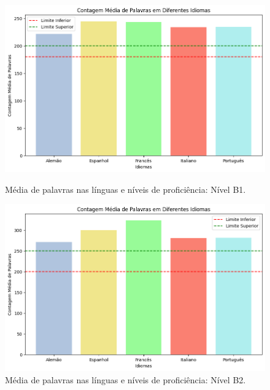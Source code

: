 \documentclass[portuguese]{textolivre}
\begin{document}
\begin{figure}[p]
 \centering
 \begin{minipage}{.47\textwidth}
 \includegraphics[width=\textwidth]{Fig3.png}
 \caption{Média de palavras nas línguas e níveis de proficiência: Nível B1.}
 \label{fig3}
 \end{minipage}%
 \qquad
 \begin{minipage}{0.47\textwidth}
 \includegraphics[width=\textwidth]{Fig4.png}
 \caption{Média de palavras nas línguas e níveis de proficiência: Nível B2.}
 \label{fig4} 
 \end{minipage}%
\end{figure}
\end{document}
